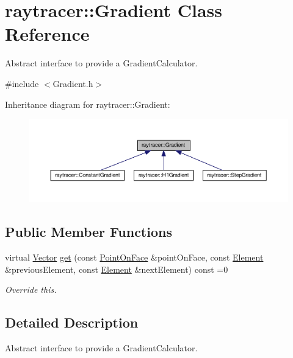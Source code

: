 \hypertarget{classraytracer_1_1Gradient}{}\section{raytracer\+:\+:Gradient Class Reference}
\label{classraytracer_1_1Gradient}


Abstract interface to provide a Gradient\+Calculator.  




{\ttfamily \#include $<$Gradient.\+h$>$}



Inheritance diagram for raytracer\+:\+:Gradient\+:
\nopagebreak
\begin{figure}[H]
\begin{center}
\leavevmode
\includegraphics[width=350pt]{classraytracer_1_1Gradient__inherit__graph}
\end{center}
\end{figure}
\subsection*{Public Member Functions}
\begin{DoxyCompactItemize}
\item 
virtual \hyperlink{classraytracer_1_1Vector}{Vector} \hyperlink{classraytracer_1_1Gradient_a93ccfef0662634c5f9a3c8dd04e73496}{get} (const \hyperlink{structraytracer_1_1PointOnFace}{Point\+On\+Face} \&point\+On\+Face, const \hyperlink{classraytracer_1_1Element}{Element} \&previous\+Element, const \hyperlink{classraytracer_1_1Element}{Element} \&next\+Element) const =0
\begin{DoxyCompactList}\small\item\em Override this. \end{DoxyCompactList}\end{DoxyCompactItemize}


\subsection{Detailed Description}
Abstract interface to provide a Gradient\+Calculator. 

